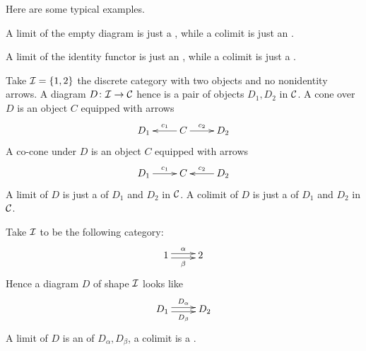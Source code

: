   Here are some typical examples.
\begin{exam}
  A limit of the empty diagram is just a , while a colimit is just an .
\end{exam}
\begin{exam}
  A limit of the identity functor is just an , while a colimit is just a .
\end{exam}
\begin{exam}
  Take ${\cal I}=\{1,2\}$ the discrete category with two objects and no nonidentity arrows. A diagram $D\colon{\cal I}\to{\cal C}$ hence is a pair of objects $D_1, D_2$ in ${\cal C}$. A cone over $D$ is an object $C$ equipped with arrows
  \begin{displaymath}
      \xymatrix{
         D_1&C\ar[l]_-{c_1}\ar[r]^-{c_2}&D_2
      }
  \end{displaymath}
  A co-cone under $D$ is an object $C$ equipped with arrows
  \begin{displaymath}
      \xymatrix{
         D_1\ar[r]^-{c_1}&C&D_2\ar[l]_-{c_2}
      }
  \end{displaymath}
  A limit of $D$ is just a  of $D_1$ and $D_2$ in ${\cal C}$.
  A colimit of $D$ is just a  of $D_1$ and $D_2$ in ${\cal C}$.
\end{exam}

\begin{exam}\label{exam:equalizer}
  Take ${\cal I}$ to be the following category:
  \begin{displaymath}
      \xymatrix{
         1\ar@<0.5ex>[r]^{\alpha}\ar@<-0.5ex>[r]_{\beta} &2
      }
  \end{displaymath}
  Hence a diagram $D$ of shape ${\cal I}$ looks like
  \begin{displaymath}
      \xymatrix{
         D_1\ar@<0.5ex>[r]^{D_{\alpha}}\ar@<-0.5ex>[r]_{D_{\beta}} &D_2
      }
  \end{displaymath}
  A limit of $D$ is an  of $D_{\alpha},D_{\beta}$, a colimit is a .
\end{exam}

